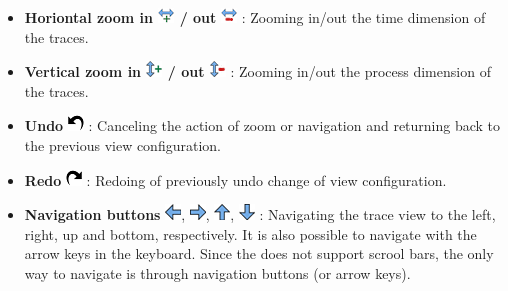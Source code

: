 \begin{itemize}
\item \textbf{Horiontal zoom in \includegraphics{fig/hpctraceviewer-button-zoom-in-time.png} / out }\includegraphics{fig/hpctraceviewer-button-zoom-out-time.png} : Zooming in/out the time dimension of the traces. 
\item \textbf{Vertical zoom in \includegraphics[scale=.5]{fig/hpctraceviewer-button-zoom-in-process.png} / out \includegraphics[scale=.5]{fig/hpctraceviewer-button-zoom-out-process.png} }: Zooming in/out the process dimension of the traces.
\item \textbf{Undo} \includegraphics[scale=.5]{fig/hpctraceviewer-button-undo.png} : Canceling the action of zoom or navigation and returning back to the previous view configuration.
\item \textbf{Redo} \includegraphics[scale=.5]{fig/hpctraceviewer-button-redo.png} : Redoing of previously undo change of view configuration.
\item \textbf{Navigation buttons} \includegraphics[scale=.5]{fig/hpctraceviewer-button-go-east.png}, \includegraphics[scale=.5]{fig/hpctraceviewer-button-go-west.png}, \includegraphics[scale=.5]{fig/hpctraceviewer-button-go-north.png}, \includegraphics[scale=.5]{fig/hpctraceviewer-button-go-south.png} : Navigating the trace view to the left, right, up and bottom, respectively. It is also possible to navigate with the arrow keys in the keyboard. Since the \traceview{} does not support scrool bars, the only way to navigate is through navigation buttons (or arrow keys).


\end{itemize}


